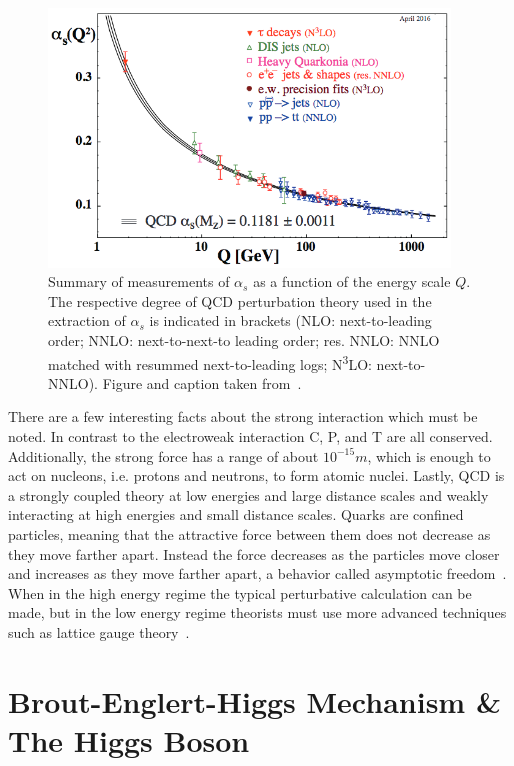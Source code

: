 \begin{figure}[hbt]
	\begin{center}
		\includegraphics[width=0.95\textwidth]{figures/Chapter2/StrongCouplingConstant.png}
		\caption{Summary of measurements of $\alpha_{s}$ as a function of the energy scale $Q$. The respective degree of QCD perturbation theory used in the extraction of $\alpha_{s}$ is indicated in brackets (NLO: next-to-leading order; NNLO: next-to-next-to leading order; res. NNLO: NNLO matched with resummed next-to-leading logs; N\textsuperscript{3}LO: next-to-NNLO). Figure and caption taken from~\cite{Olive:2016xmw}.}
		\label{fig:strong_coupling_constant}
	\end{center}
\end{figure}

There are a few interesting facts about the strong interaction which must be noted.
In contrast to the electroweak interaction C, P, and T are all conserved.
Additionally, the strong force has a range of about $10^{-15}\unit{m}$, which is enough to act on nucleons, i.e. protons and neutrons, to form atomic nuclei.
Lastly, QCD is a strongly coupled theory at low energies and large distance scales and weakly interacting at high energies and small distance scales.
Quarks are confined particles, meaning that the attractive force between them does not decrease as they move farther apart.
Instead the force decreases as the particles move closer and increases as they move farther apart, a behavior called asymptotic freedom~\cite{PhysRevLett.30.1343}.
When in the high energy regime the typical perturbative calculation can be made, but in the low energy regime theorists must use more advanced techniques such as lattice gauge theory~\cite{Rothe2005}.

\section{Brout-Englert-Higgs Mechanism \& The Higgs Boson}
\label{sec:higgs_mechanism}

